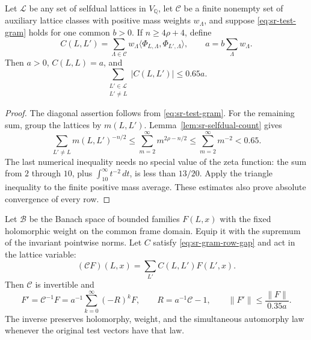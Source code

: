 \begin{srproposition}
\label{prop:sr-gram-gap}
Let \(\mathcal L\) be any set of selfdual lattices in \(V_\mathbb Q\),
let \(\mathcal C\) be a finite nonempty set of auxiliary lattice
classes with positive mass weights \(w_\Lambda\), and suppose
\eqref{eq:sr-test-gram} holds for one common \(b>0\).
If \(n\ge4\rho+4\), define
\[
 C(L,L')=\sum_{\Lambda\in\mathcal C}
       w_\Lambda\langle\Phi_{L,\Lambda},\Phi_{L',\Lambda}\rangle,
 \qquad a=b\sum_\Lambda w_\Lambda.
\]
Then \(a>0\), \(C(L,L)=a\), and
\begin{equation}\label{eq:sr-gram-row-gap}
 \sum_{\substack{L'\in\mathcal L\\L'\ne L}}|C(L,L')|
       \le0.65a.
\end{equation}
\end{srproposition}

\begin{proof}
The diagonal assertion follows from \eqref{eq:sr-test-gram}.
For the remaining sum, group the lattices by \(m(L,L')\).
Lemma~\ref{lem:sr-selfdual-count} gives
\[
 \sum_{L'\ne L}m(L,L')^{-n/2}
 \le\sum_{m=2}^\infty m^{2\rho-n/2}
 \le\sum_{m=2}^\infty m^{-2}<0.65.
\]
The last numerical inequality needs no special value of the zeta
function: the sum from \(2\) through \(10\), plus
\(\int_{10}^\infty t^{-2}\,dt\), is less than \(13/20\).
Apply the triangle inequality to the finite positive mass average.
These estimates also prove absolute convergence of every row.
\end{proof}

\begin{srproposition}
\label{prop:sr-gram-neumann}
Let \(\mathcal B\) be the Banach space of bounded families
\(F(L,x)\) with the fixed holomorphic weight on the common frame
domain.  Equip it with the supremum of the invariant pointwise
norms.  Let \(C\) satisfy
\eqref{eq:sr-gram-row-gap} and act in the lattice variable:
\[
 (\mathcal CF)(L,x)=\sum_{L'}C(L,L')F(L',x).
\]
Then \(\mathcal C\) is invertible and
\begin{equation}\label{eq:sr-gram-inverse}
 F'=\mathcal C^{-1}F
 =a^{-1}\sum_{k=0}^\infty(-R)^kF,\qquad
 R=a^{-1}\mathcal C-1,\qquad
 \|F'\|\le\frac{\|F\|}{0.35a}.
\end{equation}
The inverse preserves holomorphy, weight, and the simultaneous
automorphy law whenever the original test vectors have that law.
\end{srproposition}

